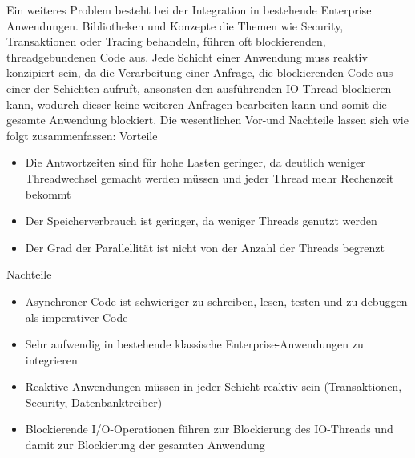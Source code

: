 Ein weiteres Problem besteht bei der Integration in bestehende Enterprise Anwendungen. Bibliotheken und Konzepte die Themen wie
Security, Transaktionen oder Tracing behandeln, führen oft blockierenden, threadgebundenen Code aus.
Jede Schicht einer Anwendung muss reaktiv konzipiert sein, da die Verarbeitung einer Anfrage, die blockierenden Code aus einer der
Schichten aufruft, ansonsten den ausführenden IO-Thread blockieren kann, wodurch dieser keine weiteren Anfragen bearbeiten kann und somit die gesamte Anwendung blockiert.
\newline\newline
Die wesentlichen Vor-und Nachteile lassen sich wie folgt zusammenfassen:
\newline
\newline
Vorteile
\begin{itemize}
  \item Die Antwortzeiten sind für hohe Lasten geringer, da deutlich weniger Threadwechsel gemacht werden müssen und jeder Thread
        mehr Rechenzeit bekommt
  \item Der Speicherverbrauch ist geringer, da weniger Threads genutzt werden
  \item Der Grad der Parallellität ist nicht von der Anzahl der Threads begrenzt
\end{itemize}
Nachteile
\begin{itemize}
  \item Asynchroner Code ist schwieriger zu schreiben, lesen, testen und zu debuggen als imperativer Code
  \item Sehr aufwendig in bestehende klassische Enterprise-Anwendungen zu integrieren
  \item Reaktive Anwendungen müssen in jeder Schicht reaktiv sein (Transaktionen, Security, Datenbanktreiber)
  \item Blockierende I/O-Operationen führen zur Blockierung des IO-Threads und damit zur Blockierung der gesamten Anwendung
\end{itemize}

